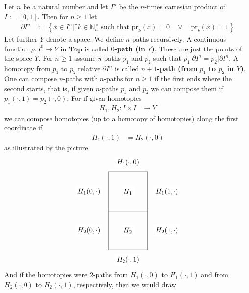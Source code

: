 \begin{enumerate}
Let $n$ be a natural number and let $I^{n}$ be the $n$-times cartesian product of $I := [0,1]$. Then for $n \geq 1$ let
\begin{align*}
  \partial I^{n}
  &:=
  \left\lbrace
      x
      \in
      I^{n}
    \vert
      \exists
      k
      \in
      \mathbb{N}_{n}^{\times}
      \text{ such that }
      \mathrm{pr}_{k}(x)
      =
      0
      \quad
      \lor
      \quad
      \mathrm{pr}_{k}(x)
      =
      1
  \right\rbrace
\end{align*}
Let further $Y$ denote a space. We define $n$-paths recursively. A continuous function $p \colon I^{0} \rightarrow Y$ in $\mathbf{Top}$ is called \textbf{$0$-path (in $Y$)}. These are just the points of the space $Y$. For $n \geq 1$ assume $n$-paths $p_{1}$ and $p_{2}$ such that $p_{1} \vert \partial I^{n} = p_{2} \vert \partial I^{n}$. A homotopy from $p_{1}$ to $p_{2}$ relative $\partial I^{n}$ is called \textbf{$n+1$-path (from $p_{1}$ to $p_{2}$ in $Y$)}. One can compose $n$-paths with $n$-paths for $n \geq 1$ if the first ends where the second starts, that is, if given $n$-paths $p_{1}$ and $p_{2}$ we can compose them if $p_{1}(\cdot,1) = p_{2}(\cdot,0)$. For if given homotopies
\begin{align*}
  H_{1},H_{2}
  \colon
  I
  \times
  I
  &\rightarrow
  Y
\end{align*}
we can compose homotopies (up to a homotopy of homotopies) along the first coordinate if
\begin{align*}
  H_{1}(\cdot,1)
  &=
  H_{2}(\cdot,0)
\end{align*}
as illustrated by the picture
\[
\begin{tikzpicture}[scale=0.5]
  \draw
    (0,0)
    --
    (4,0)
    --
    (4,4)
    --
    (0,4)
    --
    (0,0);
  \draw
    (0,4)
    --
    (0,8)
    --
    (4,8)
    --
    (4,4);
  \draw
    (2,2)
    --
    (2,2) node[fill=white] {$H_{2}$};
  \draw
    (2,6)
    --
    (2,6) node[fill=white] {$H_{1}$};
  \draw
    (2,-1)
    --
    (2,-1) node[fill=white] {$H_{2}(\cdot,1)$};
  \draw
    (2,9)
    --
    (2,9) node[fill=white] {$H_{1}(\cdot,0)$};
  \draw
    (-2,2)
    --
    (-2,2) node[fill=white] {$H_{2}(0,\cdot)$};
  \draw
    (-2,6)
    --
    (-2,6) node[fill=white] {$H_{1}(0,\cdot)$};
  \draw
    (6,2)
    --
    (6,2) node[fill=white] {$H_{2}(1,\cdot)$};
  \draw
    (6,6)
    --
    (6,6) node[fill=white] {$H_{1}(1,\cdot)$};
\end{tikzpicture}
\]
And if the homotopies were $2$-paths from $H_{1}(\cdot,0)$ to $H_{1}(\cdot,1)$ and from $H_{2}(\cdot,0)$ to $H_{2}(\cdot,1)$, respectively, then we would draw

\end{enumerate}
